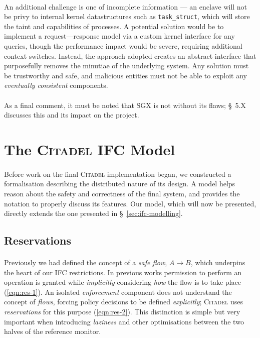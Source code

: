 \paragraph{} An additional challenge is one of incomplete information --- an enclave will not be privy to internal kernel datastructures such as \texttt{task\_struct}, which will store the taint and capabilities of processes. A potential solution would be to implement a request---response model via a custom kernel interface for any queries, though the performance impact would be severe, requiring additional context switches. Instead, the approach adopted creates an abstract interface that purposefully removes the minutiae of the underlying system. Any solution must be trustworthy and safe, and malicious entities must not be able to exploit any \textit{eventually consistent} components.~\cite{10.1145/1435417.1435432}

\paragraph{} As a final comment, it must be noted that SGX is not without its flaws; §~5.X discusses this and its impact on the project.



\section{The \textsc{Citadel} IFC Model}

\paragraph{} Before work on the final \textsc{Citadel} implementation began, we constructed a formalisation describing the distributed nature of its design. A model helps reason about the safety and correctness of the final system, and provides the notation to properly discuss its features. Our model, which will now be presented, directly extends the one presented in §~\ref{sec:ifc-modelling}.

\subsection{Reservations}

\paragraph{} Previously we had defined the concept of a \textit{safe flow}, $A \rightarrow B$, which underpins the heart of our IFC restrictions. In previous works permission to perform an operation is granted while \textit{implicitly} considering \textit{how} the flow is to take place (\ref{eqn:res-1}). An isolated \textit{enforcement} component does not understand the concept of \textit{flows}, forcing policy decisions to be defined \textit{explicitly}; \textsc{Citadel} uses \textit{reservations} for this purpose (\ref{eqn:res-2}). This distinction is simple but very important when introducing \textit{laziness} and other optimisations between the two halves of the reference monitor.

